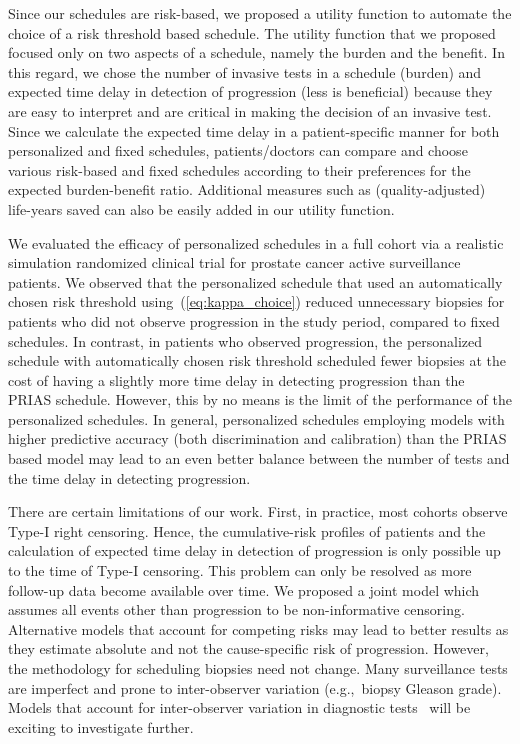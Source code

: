 Since our schedules are risk-based, we proposed a utility function to automate the choice of a risk threshold based schedule. The utility function that we proposed focused only on two aspects of a schedule, namely the burden and the benefit. In this regard, we chose the number of invasive tests in a schedule (burden) and expected time delay in detection of progression (less is beneficial) because they are easy to interpret and are critical in making the decision of an invasive test. Since we calculate the expected time delay in a patient-specific manner for both personalized and fixed schedules, patients/doctors can compare and choose various risk-based and fixed schedules according to their preferences for the expected burden-benefit ratio. Additional measures such as (quality-adjusted) life-years saved can also be easily added in our utility function. 

We evaluated the efficacy of personalized schedules in a full cohort via a realistic simulation randomized clinical trial for prostate cancer active surveillance patients. We observed that the personalized schedule that used an automatically chosen risk threshold using~(\ref{eq:kappa_choice}) reduced unnecessary biopsies for patients who did not observe progression in the study period, compared to fixed schedules. In contrast, in patients who observed progression, the personalized schedule with automatically chosen risk threshold scheduled fewer biopsies at the cost of having a slightly more time delay in detecting progression than the PRIAS schedule. However, this by no means is the limit of the performance of the personalized schedules. In general, personalized schedules employing models with higher predictive accuracy (both discrimination and calibration) than the PRIAS based model may lead to an even better balance between the number of tests and the time delay in detecting progression.

There are certain limitations of our work. First, in practice, most cohorts observe Type-I right censoring. Hence, the cumulative-risk profiles of patients and the calculation of expected time delay in detection of progression is only possible up to the time of Type-I censoring. This problem can only be resolved as more follow-up data become available over time. We proposed a joint model which assumes all events other than progression to be non-informative censoring. Alternative models that account for competing risks may lead to better results as they estimate absolute and not the cause-specific risk of progression. However, the methodology for scheduling biopsies need not change. Many surveillance tests are imperfect and prone to inter-observer variation (e.g.,~biopsy Gleason grade). Models that account for inter-observer variation in diagnostic tests~\citep{balasubramanian2003estimation} will be exciting to investigate further.